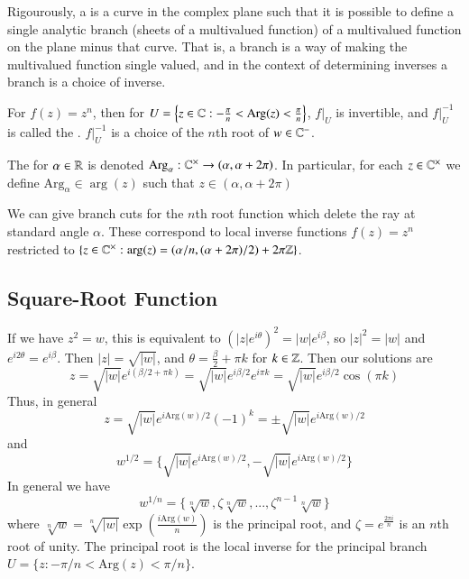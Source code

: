 \documentclass[12pt, a4paper, oneside, openright, titlepage]{book}
\begin{document}
Rigourously, a  is a curve in the complex plane such that it is possible to define a single analytic branch (sheets of a multivalued function) of a multivalued function on the plane minus that curve. That is, a branch is a way of making the multivalued function single valued, and in the context of determining inverses a branch is a choice of inverse.

\begin{eg}
    For $f(z) = z^n$, then for $U = \left\{z \in \mathbb C: -\frac{\pi}{n}<\text{Arg}(z) < \frac{\pi}{n}\right\}$, $f\vert_{U}$ is invertible, and $f\vert_{U}^{-1}$ is called the . $f\vert_U^{-1}$ is a choice of the $n$th root of $w \in \mathbb C^-$. 
\end{eg}


\begin{defn}
    The  for $\alpha \in \mathbb R$ is denoted $\text{Arg}_{\alpha}:\mathbb C^{\times}\rightarrow (\alpha,\alpha+2\pi)$. In particular, for each $z \in \mathbb C^{\times}$ we define $\text{Arg}_{\alpha} \in \arg(z)$ such that $z \in (\alpha,\alpha+2\pi)$
\end{defn}

We can give branch cuts for the $n$th root function which delete the ray at standard angle $\alpha$. These correspond to local inverse functions $f(z) = z^n$ restricted to $\{z \in \mathbb C^{\times}:\arg(z) = (\alpha/n,(\alpha+2\pi)/2)+2\pi\mathbb Z\}$.


\subsection{Square-Root Function}

If we have $z^2 = w$, this is equivalent to $(|z|e^{i\theta})^2 = |w|e^{i\beta}$, so $|z|^2=|w|$ and $e^{i2\theta} = e^{i\beta}$. Then $|z| = \sqrt{|w|}$, and $\theta = \frac{\beta}{2} + \pi k$ for $k \in \mathbb Z$. Then our solutions are \begin{equation*}
    z = \sqrt{|w|}e^{i(\beta/2+\pi k)} = \sqrt{|w|}e^{i\beta/2}e^{i\pi k} = \sqrt{|w|}e^{i\beta/2}\cos(\pi k)
\end{equation*}
Thus, in general \begin{equation*}
    z = \sqrt{|w|}e^{i\text{Arg}(w)/2}(-1)^k = \pm \sqrt{|w|}e^{i\text{Arg}(w)/2}
\end{equation*}
and \begin{equation*}
    w^{1/2} = \{\sqrt{|w|}e^{i\text{Arg}(w)/2}, -\sqrt{|w|}e^{i\text{Arg}(w)/2}\}
\end{equation*}
In general we have \begin{equation*}
    w^{1/n} = \{\sqrt[n]{w},\zeta\sqrt[n]{w},...,\zeta^{n-1}\sqrt[n]{w}\}
\end{equation*}
where $\sqrt[n]{w} = \sqrt[n]{|w|}\exp\left(\frac{i\text{Arg}(w)}{n}\right)$ is the principal root, and $\zeta = e^{\frac{2\pi i}{n}}$ is an $n$th root of unity. The principal root is the local inverse for the principal branch $U = 
\{z:-\pi/n < \text{Arg}(z) < \pi/n\}$. 
\end{document}
